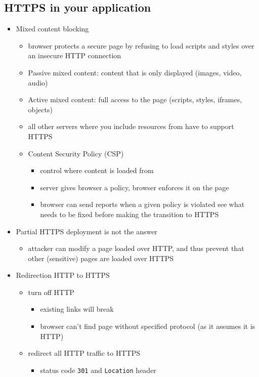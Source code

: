 \documentclass[12pt,titlepage,a4paper]{report}
\begin{document}
			\subsection{HTTPS in your application}
			\begin{itemize}
				\item Mixed content blocking
				\begin{itemize}
					\item browser protects a secure page by refusing to load scripts and styles over an insecure HTTP connection
					\item Passive mixed content: content that is only displayed (images, video, audio)
					\item Active mixed content: full access to the page (scripts, styles, iframes, objects)
					\item all other servers where you include resources from have to support HTTPS
					\item Content Security Policy (CSP)
					\begin{itemize}
						\item control where content is loaded from
						\item server gives browser a policy, browser enforces it on the page
						\item browser can send reports when a given policy is violated
							\subitem see what needs to be fixed before making the transition to HTTPS
					\end{itemize}
				\end{itemize}
			
				\item Partial HTTPS deployment is not the answer
				\begin{itemize}
					\item attacker can modify a page loaded over HTTP, and thus prevent that other (sensitive) pages are loaded over HTTPS
				\end{itemize}
			
				\item Redirection HTTP to HTTPS
				\begin{itemize}
					\item turn off HTTP
					\begin{itemize}
						\item existing links will break
						\item browser can't find page without specified protocol (as it assumes it is HTTP)
					\end{itemize}
					\item redirect all HTTP traffic to HTTPS
					\begin{itemize}
						\item status code \texttt{301} and \texttt{Location} header
					\end{itemize}
				\end{itemize}
			

\end{itemize}
\end{document}
